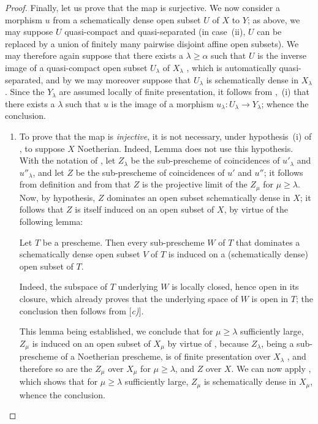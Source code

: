\begin{proof}
Finally, let us prove that the map  is surjective.
We now consider a morphism $u$ from a schematically dense open subset $U$ of $X$ to $Y$; as above, we may suppose $U$ quasi-compact and quasi-separated (in case~(ii), $U$ can be replaced by a union of finitely many pairwise disjoint affine open subsets).
We may therefore again suppose that there exists a $\lambda\geq\alpha$ such that $U$ is the inverse image of a quasi-compact open subset $U_\lambda$ of $X_\lambda$ , which is automatically quasi-separated, and by  we may moreover suppose that $U_\lambda$ is schematically dense in $X_\lambda$.
Since the $Y_\lambda$ are assumed locally of finite presentation, it follows from ,~(i) that there exists a $\lambda$ such that $u$ is the image of a morphism $u_\lambda:U_\lambda\to Y_\lambda$; whence the conclusion.

\begin{remarks}[20.3.8.7]
\label{IV.20.3.8.7}
\begin{enumerate}[label=(\roman*)]
  \item To prove that the map  is \emph{injective}, it is not necessary, under hypothesis~(i) of , to suppose $X$ Noetherian.
  Indeed, Lemma  does not use this hypothesis.
  With the notation of , let $Z_\lambda$ be the sub-prescheme of coincidences of $u'_\lambda$ and $u''_\lambda$, and let $Z$ be the sub-prescheme of coincidences of $u'$ and $u''$; it follows from definition  and from  that $Z$ is the projective limit of the $Z_\mu$ for $\mu\geq\lambda$.
  Now, by hypothesis, $Z$ dominates an open subset schematically dense in $X$; it follows that $Z$ is itself induced on an open subset of $X$, by virtue of the following lemma:

\begin{lemma}[20.3.8.8]
\label{IV.20.3.8.8}
Let $T$ be a prescheme.
Then every sub-prescheme $W$ of $T$ that dominates a schematically dense open subset $V$ of $T$ is induced on a (schematically dense) open subset of $T$.
\end{lemma}

  Indeed, the subspace of $T$ underlying $W$ is locally closed, hence open
  in its closure, which already proves that the underlying space of $W$ is open in $T$; the conclusion then follows from [\emph{c)}].

  This lemma being established, we conclude that for $\mu\geq\lambda$ sufficiently large, $Z_\mu$ is induced on an open subset of $X_\mu$ by virtue of , because $Z_\lambda$, being a sub-prescheme of a Noetherian prescheme, is of finite presentation over $X_\lambda$ , and therefore so are the $Z_\mu$ over $X_\mu$ for $\mu\geq\lambda$, and $Z$ over $X$.
  We can now apply , which shows that for $\mu\geq\lambda$ sufficiently large, $Z_\mu$ is schematically dense in $X_\mu$, whence the conclusion.


\end{enumerate}
\end{remarks}
\end{proof}
